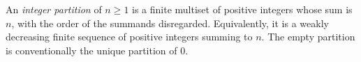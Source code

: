 
An \emph{integer partition} of $n\ge1$ is a finite multiset of positive integers whose sum is $n$, with the order of the summands disregarded. Equivalently, it is a weakly decreasing finite sequence of positive integers summing to $n$. The empty partition is conventionally the unique partition of $0$.
